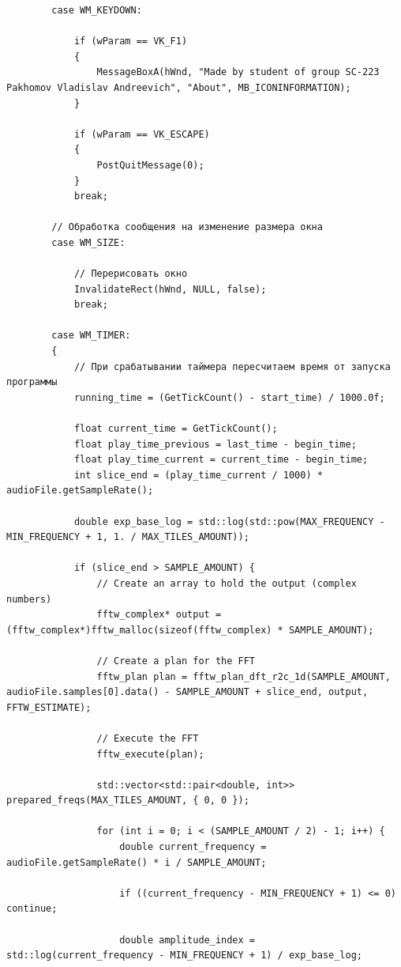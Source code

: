 \documentclass[a4paper,14pt]{extarticle}
\begin{document}
\begin{verbatim}
        case WM_KEYDOWN:

			if (wParam == VK_F1)
            {
                MessageBoxA(hWnd, "Made by student of group SC-223 Pakhomov Vladislav Andreevich", "About", MB_ICONINFORMATION);
            }

            if (wParam == VK_ESCAPE)
            {
                PostQuitMessage(0);
            }
            break;

        // Обработка сообщения на изменение размера окна
        case WM_SIZE:

            // Перерисовать окно
            InvalidateRect(hWnd, NULL, false);
            break;

        case WM_TIMER:
        {
            // При срабатывании таймера пересчитаем время от запуска программы
            running_time = (GetTickCount() - start_time) / 1000.0f;

            float current_time = GetTickCount();
            float play_time_previous = last_time - begin_time;
            float play_time_current = current_time - begin_time;
            int slice_end = (play_time_current / 1000) * audioFile.getSampleRate();

            double exp_base_log = std::log(std::pow(MAX_FREQUENCY - MIN_FREQUENCY + 1, 1. / MAX_TILES_AMOUNT));

            if (slice_end > SAMPLE_AMOUNT) {
                // Create an array to hold the output (complex numbers)
                fftw_complex* output = (fftw_complex*)fftw_malloc(sizeof(fftw_complex) * SAMPLE_AMOUNT);

                // Create a plan for the FFT
                fftw_plan plan = fftw_plan_dft_r2c_1d(SAMPLE_AMOUNT, audioFile.samples[0].data() - SAMPLE_AMOUNT + slice_end, output, FFTW_ESTIMATE);

                // Execute the FFT
                fftw_execute(plan);

                std::vector<std::pair<double, int>> prepared_freqs(MAX_TILES_AMOUNT, { 0, 0 });

                for (int i = 0; i < (SAMPLE_AMOUNT / 2) - 1; i++) {
                    double current_frequency = audioFile.getSampleRate() * i / SAMPLE_AMOUNT;

                    if ((current_frequency - MIN_FREQUENCY + 1) <= 0) continue;

                    double amplitude_index = std::log(current_frequency - MIN_FREQUENCY + 1) / exp_base_log;


\end{verbatim}
\end{document}
